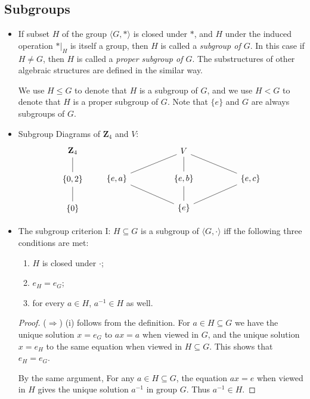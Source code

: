 \documentclass[11pt]{article}
\newcommand{\Z}{\mathbf{Z}}
\newcommand{\df}[1]{\textit{\textsf{#1}}}
\newcommand{\la}{\langle}
\newcommand{\ra}{\rangle}
\renewcommand{\implies}{\Rightarrow}
\begin{document}
\subsection{Subgroups}
\begin{itemize}
    \item If subset $H$ of the group $\la G,\ast \ra$ is closed under $\ast$, and $H$ under the induced operation $\ast|_H$ is itself a group, then $H$ is called a \df{subgroup of $G$}. In this case if $H \neq G$, then $H$ is called a \df{proper subgroup of $G$}. The substructures of other algebraic structures are defined in the similar way.

    We use $H \leq G$ to denote that $H$ is a subgroup of $G$, and we use $H < G$ to denote that $H$ is a proper subgroup of $G$. Note that $\{e\}$ and $G$ are always subgroups of $G$.
    \item Subgroup Diagrams of $\Z_4$ and $V$:
    \[\begin{tikzcd}
\Z_4 \arrow[d, no head] \\
{\{0,2\}} \arrow[d, no head] \\
\{0\}                          
\end{tikzcd} \qquad \begin{tikzcd}
&  & V \arrow[d, no head] \arrow[lld, no head] \arrow[rrd, no head] &  &\\
{\{e,a\}} \arrow[rrd, no head] &  & {\{e,b\}} \arrow[d, no head] &  & {\{e,c\}} \arrow[lld, no head] \\ &  & \{e\} &  &
\end{tikzcd}\]
    \item The subgroup criterion I: $H \subseteq G$ is a subgroup of $\la G,\cdot \ra$ iff the following three conditions are met:
    \begin{enumerate}[label=(\roman*)]
        \item $H$ is closed under $\cdot$;
        \item $e_H = e_G$;
        \item for every $a \in H$, $a^{-1} \in H$ as well.
    \end{enumerate}
    \begin{proof}
        ($\implies$) (i) follows from the definition. For $a \in H \subseteq G$ we have the unique solution $x = e_G$ to $ax = a$ when viewed in $G$, and the unique solution $x = e_H$ to the same equation when viewed in $H \subseteq G$. This shows that $e_H = e_G$.

        By the same argument, For any $a \in H \subseteq G$, the equation $ax = e$ when viewed in $H$ gives the unique solution $a^{-1}$ in group $G$. Thus $a^{-1} \in H$.


\end{proof}
\end{itemize}
\end{document}
